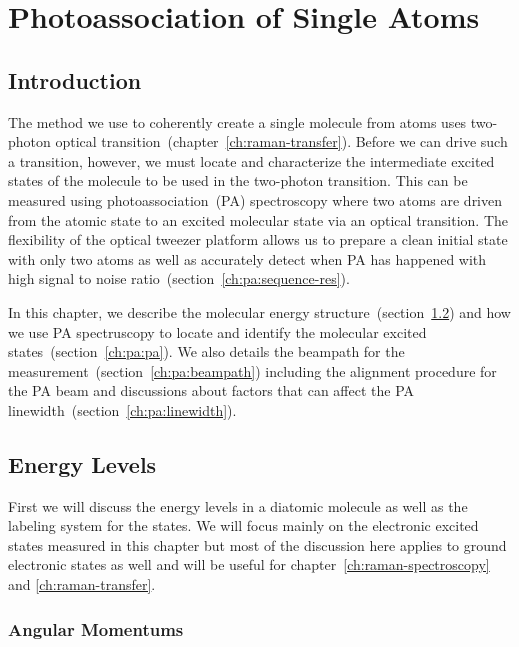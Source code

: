 
\chapter{Photoassociation of Single Atoms}
\label{ch:pa}

\section{Introduction}

The method we use to coherently create a single molecule from atoms
uses two-photon optical transition~(chapter~\ref{ch:raman-transfer}).
Before we can drive such a transition, however, we must locate and characterize
the intermediate excited states of the molecule to be used in the two-photon transition.
This can be measured using photoassociation~(PA) spectroscopy
where two atoms are driven from the atomic state to an excited molecular state
via an optical transition.
The flexibility of the optical tweezer platform allows us to
prepare a clean initial state with only two atoms
as well as accurately detect when PA has happened
with high signal to noise ratio~(section~\ref{ch:pa:sequence-res}).

In this chapter, we describe the molecular energy structure~(section~\ref{ch:pa:structure})
and how we use PA spectruscopy to locate and
identify the molecular excited states~(section~\ref{ch:pa:pa}).
We also details the beampath for the measurement~(section~\ref{ch:pa:beampath}) including
the alignment procedure for the PA beam and discussions about factors that can affect
the PA linewidth~(section~\ref{ch:pa:linewidth}).

\section{Energy Levels}
\label{ch:pa:structure}

First we will discuss the energy levels in a diatomic molecule
as well as the labeling system for the states.
We will focus mainly on the electronic excited states measured in this chapter
but most of the discussion here applies to ground electronic states as well
and will be useful for chapter~\ref{ch:raman-spectroscopy} and \ref{ch:raman-transfer}.

\subsection{Angular Momentums}

